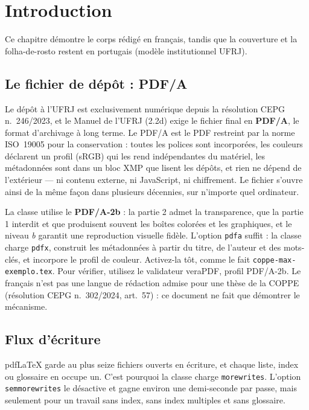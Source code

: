 \documentclass[french,dsc]{ufrj}
\begin{document}
  \chapter{Introduction}
  Ce chapitre démontre le corps rédigé en français, tandis que
  la couverture et la folha-de-rosto restent en portugais (modèle
  institutionnel UFRJ).
  \section{Le fichier de dépôt : PDF/A}
  Le dépôt à l'UFRJ est exclusivement numérique depuis la résolution CEPG
  n.~246/2023, et le Manuel de l'UFRJ (2.2d) exige le fichier final en
  \textbf{PDF/A}, le format d'archivage à long terme. Le PDF/A est le PDF
  restreint par la norme ISO~19005 pour la conservation : toutes les polices
  sont incorporées, les couleurs déclarent un profil (sRGB) qui les rend
  indépendantes du matériel, les métadonnées sont dans un bloc XMP que lisent
  les dépôts, et rien ne dépend de l'extérieur --- ni contenu externe, ni
  JavaScript, ni chiffrement. Le fichier s'ouvre ainsi de la même façon dans
  plusieurs décennies, sur n'importe quel ordinateur.

  La classe utilise le \textbf{PDF/A-2b} : la partie 2 admet la transparence,
  que la partie 1 interdit et que produisent souvent les boîtes colorées et les
  graphiques, et le niveau \emph{b} garantit une reproduction visuelle fidèle.
  L'option \texttt{pdfa} suffit : la classe charge \texttt{pdfx}, construit les
  métadonnées à partir du titre, de l'auteur et des mots-clés, et incorpore le
  profil de couleur. Activez-la tôt, comme le fait \texttt{coppe-max-exemplo.tex}. Pour
  vérifier, utilisez le validateur veraPDF, profil PDF/A-2b. Le français n'est
  pas une langue de rédaction admise pour une thèse de la COPPE (résolution
  CEPG n.~302/2024, art.~57) : ce document ne fait que démontrer le mécanisme.

  \section{Flux d'écriture}
  pdf\LaTeX{} garde au plus seize fichiers ouverts en écriture, et chaque liste,
  index ou glossaire en occupe un. C'est pourquoi la classe charge
  \texttt{morewrites}. L'option \texttt{semmorewrites} le désactive et gagne
  environ une demi-seconde par passe, mais seulement pour un travail sans index,
  sans index multiples et sans glossaire.
\end{document}

